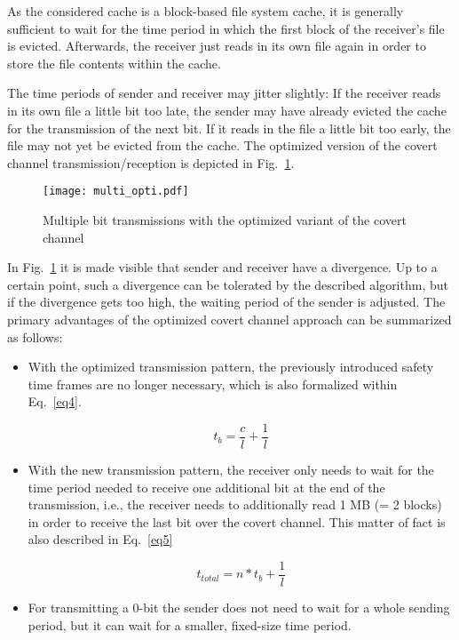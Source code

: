 \documentclass[runningheads,a4paper]{llncs}
\begin{document}
As the considered cache is a block-based file system cache, it is generally sufficient to wait for the time period in which the first block of the receiver's file is evicted. 
Afterwards, the receiver just reads in its own file again in order to store the file contents within the cache. 

The time periods of sender and receiver may jitter slightly:
If the receiver reads in its own file a little bit too late, the sender may have already evicted the cache for the transmission of the next bit.
If it reads in the file a little bit too early, the file may not yet be evicted from the cache.
The optimized version of the covert channel transmission/reception is depicted in Fig.~\ref{multi_opti}.

\begin{figure}[!ht]
\texttt{[image: multi\_opti.pdf]}
\caption{Multiple bit transmissions with the optimized variant of the covert channel}
\label{multi_opti}
\end{figure}

In Fig.~\ref{multi_opti} it is made visible that sender and receiver have a divergence.
Up to a certain point, such a divergence can be tolerated by the described algorithm, but if the divergence gets too high, the waiting period of the sender is adjusted.
The primary advantages of the optimized covert channel approach can be summarized as follows:

\begin{itemize}
\item With the optimized transmission pattern, the previously introduced safety time frames are no longer necessary, which is also formalized within Eq.~\ref{eq4}.

\begin{equation}\label{eq4}
t_{b}=\frac{c}{l}+\frac{1}{l}
\end{equation}

\item With the new transmission pattern, the receiver only needs to wait for the time period needed to receive one additional bit at the end of the transmission, i.e., the receiver needs to additionally read 1 MB (= 2 blocks) in order to receive the last bit over the covert channel.
This matter of fact is also described in Eq.~\ref{eq5}

\begin{equation}\label{eq5}
t_{total}=n * t_{b} + \frac{1}{l}
\end{equation}

\item For transmitting a 0-bit the sender does not need to wait for a whole sending period, but it can wait for a smaller, fixed-size time period.
\end{itemize}
\end{document}
